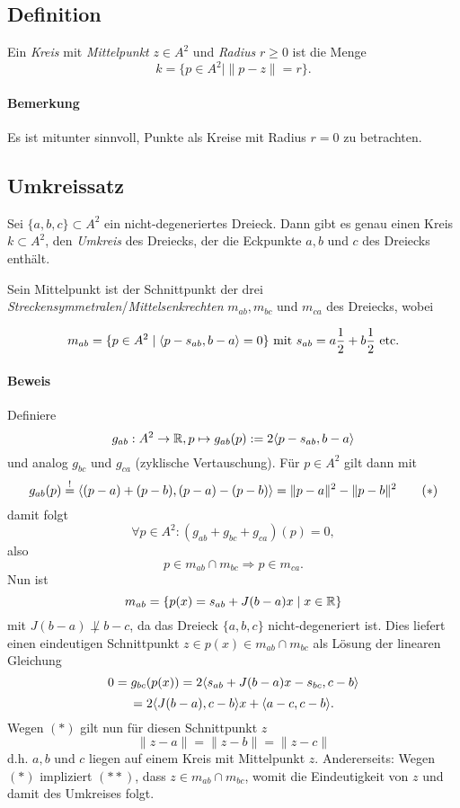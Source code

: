 \subsection{Definition}
\begin{Definition}
    Ein \emph{Kreis} mit \emph{Mittelpunkt} $ z\in A^2 $ und \emph{Radius} $ r\geq 0 $ ist die Menge
		\[ k = \{p\in A^2\mid \|p-z\| = r\}. \]
\end{Definition}
\paragraph{Bemerkung}
	Es ist mitunter sinnvoll, Punkte als Kreise mit Radius $ r=0 $ zu betrachten.
	
\subsection{Umkreissatz}
\begin{Satz}[Umkreissatz]
	Sei $ \{a,b,c\} \subset A^2 $ ein nicht-degeneriertes Dreieck. Dann gibt es genau einen Kreis $ k\subset A^2 $, den \emph{Umkreis} des Dreiecks, der die Eckpunkte $ a,b $ und $ c $ des Dreiecks enthält.
\end{Satz}	
	Sein Mittelpunkt ist der Schnittpunkt der drei \emph{Streckensymmetralen}/\emph{Mittelsenkrechten} $ m_{ab}, m_{bc}$ und $ m_{ca} $ des Dreiecks, wobei

    		\[ m_{ab} = \{p\in A^2\mid \langle p-s_{ab},b-a \rangle = 0\} \text{ mit } s_{ab} = a\frac{1}{2}+b\frac{1}{2} \text{ etc}. \]
 
     	\begin{figure}[h]\centering
     		
    	\end{figure}

	
\paragraph{Beweis}
	Definiere
		\[ g_{ab} : A^2\to \mathbb{R}, p\mapsto g_{ab}(p):= 2\langle p-s_{ab},b-a \rangle \]
	und analog $ g_{bc} $ und $ g_{ca} $ (zyklische Vertauschung).
	Für $ p\in A^2 $ gilt dann mit
		\[ g_{ab}(p) \overset{!}{=} \langle (p-a)+(p-b),(p-a)-(p-b) \rangle  = \|p-a\|^2-\|p-b\|^2 \tag{$ * $} \]
	damit folgt
		\[ \forall p\in A^2: (g_{ab}+g_{bc}+g_{ca})(p) = 0, \]
	also
		\[ p\in m_{ab}\cap m_{bc} \Rightarrow p\in m_{ca}. \]
	Nun ist
		\[ m_{ab} = \{p(x) = s_{ab}+J(b-a)x\mid x\in \mathbb{R}\} \]
	mit $ J(b-a)\not\perp b-c $, da das Dreieck $ \{a,b,c\} $ nicht-degeneriert ist. Dies liefert einen eindeutigen Schnittpunkt $ z\in p(x)\in m_{ab}\cap m_{bc} $ als Lösung der linearen Gleichung
		\[ 0 = g_{bc}(p(x)) = 2\langle s_{ab}+J(b-a)x-s_{bc},c-b \rangle \]
		\[ = 2\langle J(b-a),c-b \rangle x+\langle a-c,c-b \rangle. \]
	Wegen $ (*) $ gilt nun für diesen Schnittpunkt $ z $
		\[ \|z-a\| = \|z-b\| = \|z-c\| \tag{$ ** $} \]
	d.h. $ a,b $ und $ c $ liegen auf einem Kreis mit Mittelpunkt $ z $.
	Andererseits: Wegen $ (*) $ impliziert $ (**) $, dass $ z\in m_{ab}\cap m_{bc} $, womit die Eindeutigkeit von $ z $ und damit des Umkreises folgt.

